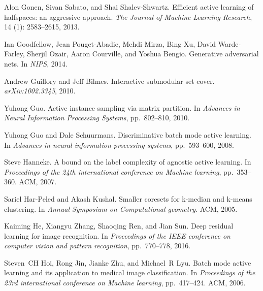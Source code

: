 \documentclass{article} \usepackage{iclr2018_conference,times}
\begin{document}
\begin{thebibliography}{51}
Alon Gonen, Sivan Sabato, and Shai Shalev-Shwartz.
\newblock Efficient active learning of halfspaces: an aggressive approach.
\newblock \emph{The Journal of Machine Learning Research}, 14
  (1): 2583--2615, 2013.

Ian Goodfellow, Jean Pouget-Abadie, Mehdi Mirza, Bing Xu, David Warde-Farley,
  Sherjil Ozair, Aaron Courville, and Yoshua Bengio.
\newblock Generative adversarial nets.
\newblock In \emph{NIPS}, 2014.

Andrew Guillory and Jeff Bilmes.
\newblock Interactive submodular set cover.
\newblock \emph{arXiv:1002.3345}, 2010.

Yuhong Guo.
\newblock Active instance sampling via matrix partition.
\newblock In \emph{Advances in Neural Information Processing Systems}, pp.\
  802--810, 2010.

Yuhong Guo and Dale Schuurmans.
\newblock Discriminative batch mode active learning.
\newblock In \emph{Advances in neural information processing systems}, pp.\
  593--600, 2008.

Steve Hanneke.
\newblock A bound on the label complexity of agnostic active learning.
\newblock In \emph{Proceedings of the 24th international conference on Machine
  learning}, pp.\  353--360. ACM, 2007.

Sariel Har-Peled and Akash Kushal.
\newblock Smaller coresets for k-median and k-means clustering.
\newblock In \emph{Annual Symposium on Computational geometry}. ACM, 2005.

\bibitem[He et~al.(2016)He, Zhang, Ren, and Sun]{he_et_al}
Kaiming He, Xiangyu Zhang, Shaoqing Ren, and Jian Sun.
\newblock Deep residual learning for image recognition.
\newblock In \emph{Proceedings of the IEEE conference on computer vision and
  pattern recognition}, pp.\  770--778, 2016.

Steven~CH Hoi, Rong Jin, Jianke Zhu, and Michael~R Lyu.
\newblock Batch mode active learning and its application to medical image
  classification.
\newblock In \emph{Proceedings of the 23rd international conference on Machine
  learning}, pp.\  417--424. ACM, 2006.


\end{thebibliography}
\end{document}
